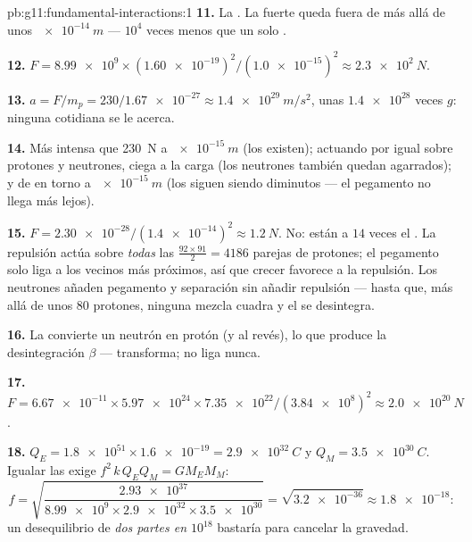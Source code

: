\begin{solution}{pb:g11:fundamental-interactions:1}
\textbf{11.} La . La  fuerte queda
fuera de  más allá de unos $\qty{e-14}{m}$ --- $10^{4}$ veces
menos que un solo .

\textbf{12.} $F = \num{8.99e9} \times (\num{1.60e-19})^2 /
(\num{1.0e-15})^2 \approx \qty{2.3e2}{N}$.

\textbf{13.} $a = F/m_p = 230/\num{1.67e-27} \approx
\qty{1.4e29}{m/s^2}$, unas $\num{1.4e28}$ veces $g$: ninguna 
cotidiana se le acerca.

\textbf{14.} Más intensa que \qty{230}{N} a $\qty{e-15}{m}$ (los 
existen); actuando por igual sobre protones y neutrones, ciega a la
carga (los neutrones también quedan agarrados); y de  en torno a
$\qty{e-15}{m}$ (los  siguen siendo diminutos --- el pegamento no
llega más lejos).

\textbf{15.} $F = \num{2.30e-28}/(\num{1.4e-14})^2 \approx
\qty{1.2}{N}$. No: están a $14$ veces el . La repulsión actúa
sobre \emph{todas} las $\frac{92\times91}{2} = 4186$ parejas de
protones; el pegamento solo liga a los vecinos más próximos, así que
crecer favorece a la repulsión. Los neutrones añaden pegamento y
separación sin añadir repulsión --- hasta que, más allá de unos $80$
protones, ninguna mezcla cuadra y el  se desintegra.

\textbf{16.} La  convierte un neutrón en protón (y al
revés), lo que produce la desintegración $\beta$ --- transforma; no liga
nunca.

\textbf{17.} $F = \num{6.67e-11} \times \num{5.97e24} \times
\num{7.35e22}/(\num{3.84e8})^2 \approx \qty{2.0e20}{N}$.

\textbf{18.} $Q_E = \num{1.8e51} \times \num{1.6e-19} =
\qty{2.9e32}{C}$ y $Q_M = \qty{3.5e30}{C}$. Igualar las  exige
$f^2\,k\,Q_E Q_M = G M_E M_M$:
\[
f = \sqrt{\frac{\num{2.93e37}}{\num{8.99e9} \times \num{2.9e32}
\times \num{3.5e30}}} = \sqrt{\num{3.2e-36}} \approx \num{1.8e-18} :
\]
un desequilibrio de \emph{dos partes en $10^{18}$} bastaría para
cancelar la gravedad.


\end{solution}
